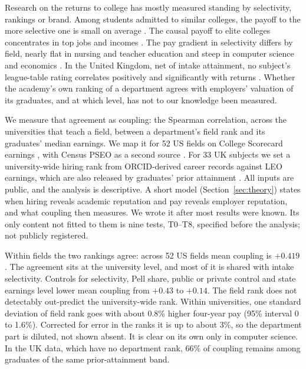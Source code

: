 Research on the returns to college has mostly measured standing by selectivity, rankings or brand. Among students
admitted to similar colleges, the payoff to the more selective one is small on average \citep{dale2002estimating,
dale2014estimating}. The causal payoff to elite colleges concentrates in top jobs and incomes
\citep{zimmerman2019elite, chetty2023diversifying}. The pay gradient in selectivity differs by field, nearly flat in
nursing and teacher education and steep in computer science and economics \citep{bloem2024understanding}. In the
United Kingdom, net of intake attainment, no subject's league-table rating correlates positively and significantly
with returns \citep{britton2022how}. Whether the academy's own ranking of a department agrees with employers'
valuation of its graduates, and at which level, has not to our knowledge been measured.

We measure that agreement as coupling: the Spearman correlation, across the universities that teach a field, between
a department's field rank and its graduates' median earnings. We map it for 52 US fields on College Scorecard
earnings \citep{scorecard}, with Census PSEO as a second source \citep{pseo, pseo2026}. For 33 UK subjects we set a
university-wide hiring rank from ORCID-derived career records \citep{li2026orcid} against LEO earnings, which are
also released by graduates' prior attainment \citep{dfe_leo_provider}. All inputs are public, and the analysis is
descriptive. A short model (Section~\ref{sec:theory}) states when hiring reveals academic reputation and pay reveals
employer reputation, and what coupling then measures. We wrote it after most results were known. Its only content
not fitted to them is nine tests, T0--T8, specified before the analysis; not publicly registered.

Within fields the two rankings agree: across 52 US fields mean coupling is $+0.419$ . The
agreement sits at the university level, and most of it is shared with intake selectivity. Controls for selectivity,
Pell share, public or private control and state earnings level lower mean coupling from $+0.43$ to $+0.14$. The
field rank does not detectably out-predict the university-wide rank. Within universities, one standard deviation of
field rank goes with about 0.8\% higher four-year pay (95\% interval 0 to 1.6\%). Corrected for error in the ranks
it is up to about 3\%, so the department part is diluted, not shown absent. It is clear on its own only in computer
science. In the UK data, which have no department rank, 66\%  of coupling remains among graduates of the
same prior-attainment band.

